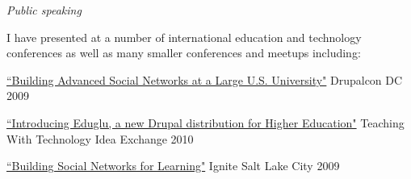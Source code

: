 \documentclass[11pt]{article}
\newenvironment{mydescription}
{ \begin{description}
    \setlength{\itemsep}{0pt}
    \setlength{\parskip}{0pt}
    \setlength{\parsep}{0pt}     }
{ \end{description}                  }
\begin{document}
\bigskip

\noindent\emph{Public speaking}

\medskip

\noindent I have presented at a number of international education and technology conferences as well as many smaller conferences and meetups including:

\medskip

\begin{mydescription}
  \item[\href{http://www.archive.org/details/DrupalconDc2009-BuildingAdvancedSocialNetworksAtALargeU.s.University}{``Building Advanced Social Networks at a Large U.S. University"}] Drupalcon DC 2009
  \item[\href{http://ttix.org/archives/2010-sessions/introducing-eduglu-a-new-drupal-distribution-for-higher-education/}{``Introducing Eduglu, a new Drupal distribution for Higher Education"}] Teaching With Technology Idea Exchange 2010
  \item[\href{http://www.ignitesaltlake.com/ignite/index.cfm/videos/ignite-salt-lake-2/}{``Building Social Networks for Learning"}] Ignite Salt Lake City 2009
\end{mydescription}
\end{document}
